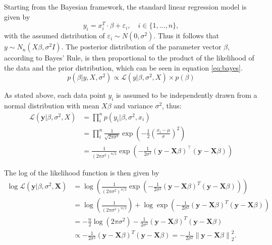 \documentclass[12pt,a4paper]{article}
\newcommand{\norm}[1]{\left\lVert#1\right\rVert}
\begin{document}
Starting from the Bayesian framework, the standard linear regression model is given by
\[
y_i = x_i^T\cdot \beta + \varepsilon_i, \quad i\in \{1,...,n\}, 
\]
with the assumed distribution of $\varepsilon_i \sim N(0,\sigma^2)$. Thus it follows that $y\sim N_n(X\beta,\sigma^2I)$. The posterior distribution of the parameter vector $\beta$, according to Bayes' Rule, is then proportional to the product of the likelihood of the data and the prior distribution, which can be seen in equation \ref{eq:bayes}.
\begin{equation}\label{eq:bayes}
p(\beta|y, X, \sigma^2) \propto \mathcal{L}(y|\beta, \sigma^2, X)\times p(\beta)
\end{equation}	

As stated above, each data point $y_i$ is assumed to be independently drawn from a normal distribution with mean $X\beta$ and variance $\sigma^2$, thus:
\begin{align}
\mathcal{L}(\mathbf{y}|\beta, \sigma^2, X) 	&= \prod_i^n p(y_i|\beta, \sigma^2, x_i) \nonumber\\
						&= \prod_i^n \frac{1}{\sqrt{2\pi\sigma^2}} \exp\left(-\frac{1}{2}\left(\frac{x_i-\mu}{\sigma}\right)^2\right) \nonumber\\
						&= \frac{1}{(2\pi\sigma^2)^{n/2}}\exp\left(-\frac{1}{2\sigma^2}(\mathbf{y}-\mathbf{X}\beta)^\top(\mathbf{y}-\mathbf{X}\beta)\right) \label{eq:likelihood}
\end{align}

The log of the likelihood function is then given by 
\begin{align*}
\log \mathcal{L}( \mathbf{y} |\beta, \sigma^2 , \mathbf{X}) &= \log \left( \frac{1}{(2\pi\sigma^2)^{n/2}} \exp\left(-\frac{1}{2\sigma^2} (\mathbf{y} - \mathbf{X}\beta)^T (\mathbf{y} - \mathbf{X}\beta)\right) \right) \\
&= \log \left( \frac{1}{(2\pi\sigma^2)^{n/2}} \right) + \log \exp\left(-\frac{1}{2\sigma^2} (\mathbf{y} - \mathbf{X}\beta)^T (\mathbf{y} - \mathbf{X}\beta)\right) \\
&= -\frac{n}{2} \log(2\pi\sigma^2) - \frac{1}{2\sigma^2} (\mathbf{y} - \mathbf{X}\beta)^T (\mathbf{y} - \mathbf{X}\beta)\\
&\propto - \frac{1}{2\sigma^2} (\mathbf{y} - \mathbf{X}\beta)^T (\mathbf{y} - \mathbf{X}\beta) = - \frac{1}{2\sigma^2}\norm{\mathbf{y} - \mathbf{X}\beta}_2^2.\\
\end{align*}
\end{document}
